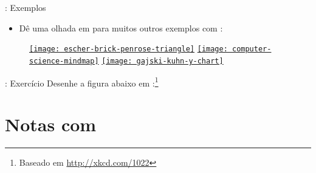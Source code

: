 \documentclass{beamer}
\begin{document}
\begin{frame}[fragile]{\insertsection: Exemplos}
\begin{itemize}
\item Dê uma olhada em   para muitos outros exemplos com \tikzname{}:
\end{itemize}
\begin{figure}
\href{http://texample.net/tikz/examples/escher-brick-penrose-triangle/}{%
  \texttt{[image: escher-brick-penrose-triangle]}}
\href{http://texample.net/tikz/examples/computer-science-mindmap/}{%
  \texttt{[image: computer-science-mindmap]}}
\href{http://texample.net/tikz/examples/gajski-kuhn-y-chart/}{%
  \texttt{[image: gajski-kuhn-y-chart]}}
\end{figure}
\end{frame}

\begin{frame}[fragile]{\insertsection: Exercício}
Desenhe a figura abaixo em \tikzname:\footnote{Baseado em \url{http://xkcd.com/1022}}
\begin{figure}

\end{figure}
\end{frame}

\section{Notas com  \protect{}}
\end{document}
